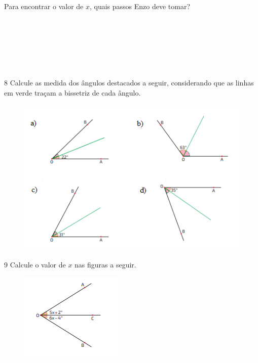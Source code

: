 {{{Para encontrar o valor de $x$, quais passos Enzo deve tomar?

\\
\\
\\
\\
\\
\\



\num{8} Calcule as medida dos ângulos destacados a seguir, considerando que as
linhas em verde traçam a bissetriz de cada ângulo.

\begin{figure}[H]
\centering\includegraphics[width=4.66667in,height=3in]{./imgSAEB_8_MAT/media/image32.png}
\end{figure}



\num{9} Calcule o valor de $x$ nas figuras a seguir.

\begin{escolha}
\item
\begin{figure}[H]
\centering\includegraphics[width=1.91667in,height=1.6875in]{./imgSAEB_8_MAT/media/image33.png}
\end{figure}


\end{escolha}}}}
